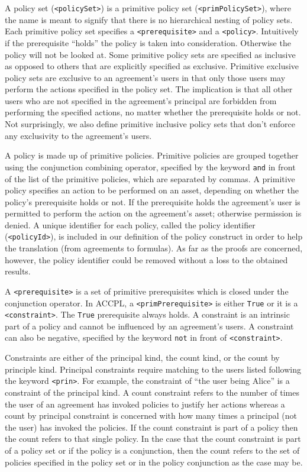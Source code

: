 \documentclass[runningheads,a4paper]{llncs}
\newcommand{\syn}{\texttt}
\begin{document}
A policy set (\syn{<policySet>}) is a primitive policy set
(\syn{<primPolicySet>}), where the name is meant to signify that there
is no hierarchical nesting of policy sets. Each primitive policy set
specifies a \syn{<prerequisite>} and a \syn{<policy>}. Intuitively if
the prerequisite ``holds'' the policy is taken into
consideration. Otherwise the policy will not be looked at. Some
primitive policy sets are specified as inclusive as opposed to others
that are explicitly specified as exclusive. Primitive exclusive policy
sets are exclusive to an agreement's users in that only those users
may perform the actions specified in the policy set. The implication
is that all other users who are not specified in the agreement's
principal are forbidden from performing the specified actions, no
matter whether the prerequisite holds or not. Not surprisingly, we also
define primitive inclusive policy sets that don't enforce any
exclusivity to the agreement's users.

A policy is made up of primitive policies. Primitive policies are
grouped together using the conjunction combining operator, specified
by the keyword \syn{and} in front of the list of the primitive
policies, which are separated by commas.  A primitive policy specifies
an action to be performed on an asset, depending on whether the
policy's prerequisite holds or not. If the prerequisite holds the
agreement's user is permitted to perform the action on the agreement's
asset; otherwise permission is denied. A unique identifier for each
policy, called the policy identifier (\syn{<policyId>}), is included
in our definition of the policy construct in order to help the
translation (from agreements to formulas).  As far as the proofs are
concerned, however, the policy identifier could be removed without a
loss to the obtained results.

A \syn{<prerequisite>} is a set of primitive prerequisites which is
closed under the conjunction operator.  In \ac{ACCPL}, a
\syn{<primPrerequisite>} is either \syn{True} or it is a
\syn{<constraint>}. The \syn{True} prerequisite always holds. A
constraint is an intrinsic part of a policy and cannot be influenced
by an agreement's users. A constraint can also be negative, specified
by the keyword \syn{not} in front of \syn{<constraint>}.

Constraints are either of the principal kind, the count kind, or the
count by principle kind. Principal constraints require matching to the users listed following the keyword \syn{<prin>}. For example, the
constraint of ``the user being Alice'' is a constraint of the
principal kind. A count constraint refers to the number of times the
user of an agreement has invoked policies to justify her actions whereas a count by principal constraint is concerned with how many times a principal (not the user) has invoked the policies. 
If the count constraint is part of a policy then the count refers to that
single policy. In the case that the count constraint is part of a
policy set or if the policy is a conjunction, then the count refers to
the set of policies specified in the policy set or in the policy
conjunction as the case may be.
\end{document}
